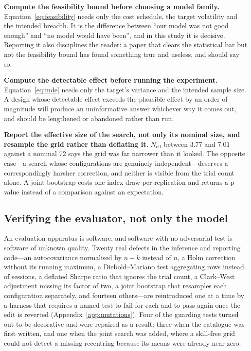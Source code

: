 \documentclass{article}
\theoremstyle{plain}
\theoremstyle{remark}
\begin{document}
\textbf{Compute the feasibility bound before choosing a model family.}
Equation~\ref{eq:feasibility} needs only the cost schedule, the target volatility
and the intended breadth. It is the difference between ``our model was not good
enough'' and ``no model would have been'', and in this study it is decisive.
Reporting it also disciplines the reader: a paper that clears the statistical bar
but not the feasibility bound has found something true and useless, and should
say so.

\textbf{Compute the detectable effect before running the experiment.}
Equation~\ref{eq:mde} needs only the target's variance and the intended sample
size. A design whose detectable effect exceeds the plausible effect by an order
of magnitude will produce an uninformative answer whichever way it comes out, and
should be lengthened or abandoned rather than run.

\textbf{Report the effective size of the search, not only its nominal size, and
resample the grid rather than deflating it.} $N_{\mathrm{eff}}$ between $3.77$
and $7.01$ against a nominal 72 says the grid was far narrower than it looked.
The opposite case---a search whose configurations are genuinely
independent---deserves a correspondingly harsher correction, and neither is
visible from the trial count alone. A joint bootstrap costs one index draw per
replication and returns a p-value instead of a comparison against an
expectation.

\subsection{Verifying the evaluator, not only the model}

An evaluation apparatus is software, and software with no adversarial test is
software of unknown quality. Twenty real defects in the inference and reporting
code---an autocovariance normalised by $n-k$ instead of $n$, a Holm correction
without its running maximum, a Diebold--Mariano test aggregating rows instead of
sessions, a deflated Sharpe ratio that ignores the trial count, a Clark--West adjustment
missing its factor of two, a joint bootstrap that resamples each configuration
separately, and fourteen others---are reintroduced one at a time by a harness that requires a named test
to fail for each and to pass again once the edit is reverted
(Appendix~\ref{app:mutations}). Four of the guarding tests turned out to be
decorative and were repaired as a result: three when the catalogue was first
written, and one when the joint search was added, where a skill-free grid could
not detect a missing recentring because its means were already near zero.
\end{document}
